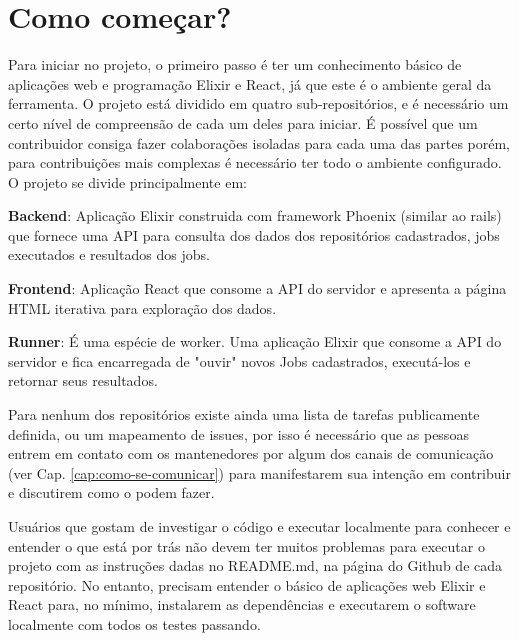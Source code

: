 \section{Como começar?}
\label{cap:como-comecar}

 Para iniciar no projeto, o primeiro passo é ter um conhecimento básico de aplicações
 web e programação Elixir e React, já que este é o ambiente geral da ferramenta. O projeto
 está dividido em quatro sub-repositórios, e é necessário um certo nível de compreensão
 de cada um deles para iniciar. É possível que um contribuidor consiga fazer
 colaborações isoladas para cada uma das partes porém, para contribuições mais complexas é necessário
 ter todo o ambiente configurado.  O projeto se divide principalmente em:

 \textbf{Backend}: Aplicação Elixir construida com framework Phoenix (similar ao rails) que
 fornece uma API para consulta dos dados dos repositórios cadastrados, jobs executados
 e resultados dos jobs.

 \textbf{Frontend}: Aplicação React que consome a API do servidor e apresenta
 a página HTML iterativa para exploração dos dados.

 \textbf{Runner}: É uma espécie de worker. Uma aplicação Elixir que consome a API
 do servidor e fica encarregada de "ouvir" novos Jobs cadastrados, executá-los
 e retornar seus resultados.

 Para nenhum dos repositórios existe ainda uma lista de tarefas publicamente definida, ou
 um mapeamento de issues, por isso é necessário que as pessoas entrem em contato com os mantenedores
 por algum dos canais de comunicação (ver Cap. \ref{cap:como-se-comunicar}) para
 manifestarem sua intenção em contribuir e discutirem como o podem fazer.

 Usuários que gostam de investigar o código e executar localmente para conhecer
 e entender o que está por trás não devem ter muitos problemas para executar
 o projeto com as instruções dadas no README.md, na página do Github de cada
 repositório. No entanto, precisam entender o básico de aplicações web Elixir
 e React para, no mínimo, instalarem as dependências e executarem o software
 localmente com todos os testes passando.
